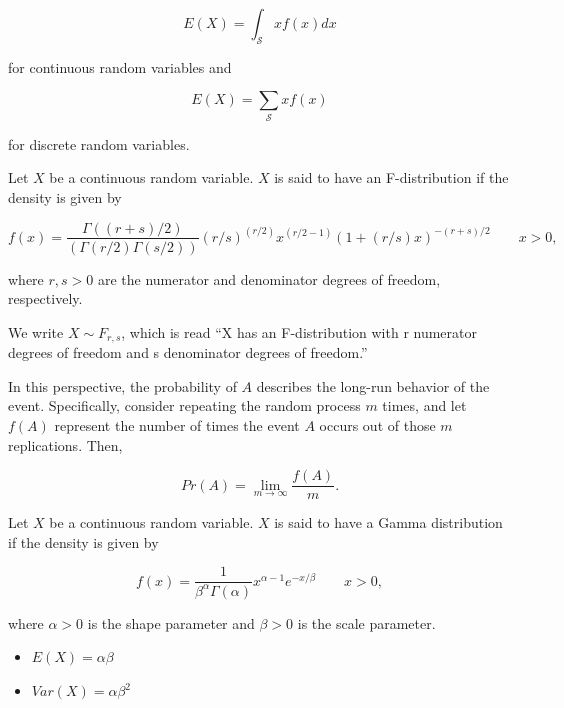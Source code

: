 \documentclass[
  letterpaper,
  DIV=11,
  numbers=noendperiod]{scrreprt}
\providecommand{\tightlist}{%
  \setlength{\itemsep}{0pt}\setlength{\parskip}{0pt}}\usepackage{longtable,booktabs,array}
\theoremstyle{plain}
\theoremstyle{definition}
\theoremstyle{definition}
\theoremstyle{remark}
\begin{document}
\[E(X) = \int_{\mathcal{S}} x f(x) dx\]

for continuous random variables and

\[E(X) = \sum_{\mathcal{S}} x f(x)\]

for discrete random variables.

\begin{description}
\tightlist
\item[F-Distribution (Definition~\ref{def-f-distribution})]
Let \(X\) be a continuous random variable. \(X\) is said to have an
F-distribution if the density is given by
\end{description}

\[f(x) = \frac{\Gamma((r + s)/2)}{(\Gamma(r/2) \Gamma(s/2))} (r/s)^{(r/2)} x^{(r/2 - 1)} (1 + (r/s) x)^{-(r + s)/2} \qquad x > 0,\]

where \(r,s > 0\) are the numerator and denominator degrees of freedom,
respectively.

We write \(X \sim F_{r, s}\), which is read ``X has an F-distribution
with r numerator degrees of freedom and s denominator degrees of
freedom.''

\begin{description}
\tightlist
\item[Frequentist Interpretation of Probability
(Definition~\ref{def-frequentist-interpretation})]
In this perspective, the probability of \(A\) describes the long-run
behavior of the event. Specifically, consider repeating the random
process \(m\) times, and let \(f(A)\) represent the number of times the
event \(A\) occurs out of those \(m\) replications. Then,
\end{description}

\[Pr(A) = \lim_{m \rightarrow \infty} \frac{f(A)}{m}.\]

\begin{description}
\tightlist
\item[Gamma Distribution (Definition~\ref{def-gamma-distribution})]
Let \(X\) be a continuous random variable. \(X\) is said to have a Gamma
distribution if the density is given by
\end{description}

\[f(x) = \frac{1}{\beta^{\alpha} \Gamma(\alpha)} x^{\alpha - 1} e^{-x/\beta} \qquad x > 0,\]

where \(\alpha > 0\) is the shape parameter and \(\beta > 0\) is the
scale parameter.

\begin{itemize}
\tightlist
\item
  \(E(X) = \alpha\beta\)
\item
  \(Var(X) = \alpha\beta^2\)
\end{itemize}
\end{document}
